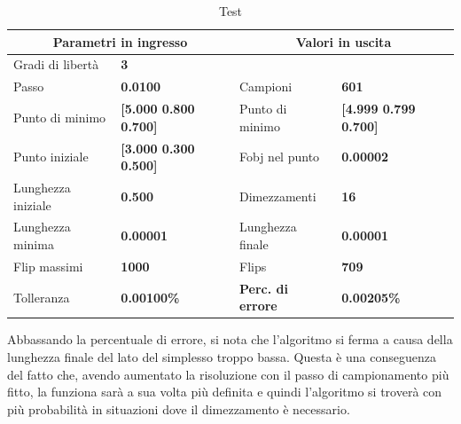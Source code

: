 \documentclass[a4paper, 11pt]{article}
\begin{document}
    \begin{table}[h]
        \caption{Test}
        \begin{center}
        \begin{tabular}{|l|l|l|l|} 
        \hline 
        \multicolumn{2}{|c|}{\textbf{Parametri in ingresso}} & \multicolumn{2}{c|}{\textbf{Valori in uscita}} \\ \hline
        Gradi di libertà  & \textbf{3} &  &  \\ \hline 
        Passo & \textbf{0.0100} & Campioni & \textbf{601} \\ \hline 
        Punto di minimo & \textbf{{[}5.000 0.800 0.700{]}} & Punto di minimo & \textbf{{[}4.999 0.799 0.700{]}} \\ \hline 
        Punto iniziale & \textbf{{[}3.000 0.300 0.500{]}} & Fobj nel punto & \textbf{0.00002} \\ \hline 
        Lunghezza iniziale & \textbf{0.500} & Dimezzamenti & \textbf{16} \\ \hline 
        Lunghezza minima & \textbf{0.00001} & Lunghezza finale & \textbf{0.00001} \\ \hline
        Flip massimi & \textbf{1000} & Flips & \textbf{709} \\ \hline 
        Tolleranza & \textbf{0.00100\%} & \textbf{Perc. di errore} & \textbf{0.00205\%} \\ \hline 
        \end{tabular}
        \end{center}
        \end{table}
\noindent
Abbassando la percentuale di errore, si nota che l'algoritmo si ferma a causa
della lunghezza finale del lato del simplesso troppo bassa. Questa è una
conseguenza del fatto che, avendo aumentato la risoluzione con il passo di
campionamento più fitto, la funziona sarà a sua volta più definita e quindi
l'algoritmo si troverà con più probabilità in situazioni dove il dimezzamento è
necessario.
\end{document}
